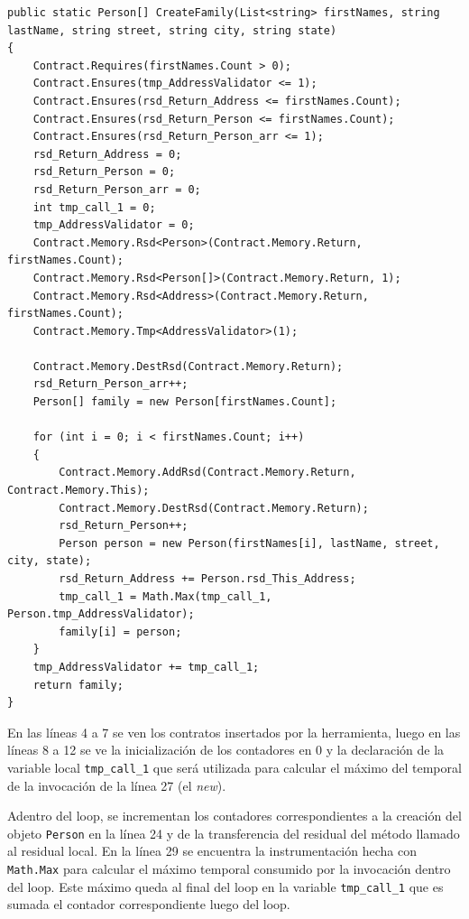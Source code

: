 \documentclass[12pt,a4paper]{article}
\newcommand\mono[1]{\texttt{#1}}
\begin{document}
			\vspace{15pt}
			\begin{scriptsize}
			\begin{lstlisting}[caption=Método \mono{CreateFamily} instrumentado]
public static Person[] CreateFamily(List<string> firstNames, string lastName, string street, string city, string state)
{
    Contract.Requires(firstNames.Count > 0);
    Contract.Ensures(tmp_AddressValidator <= 1);
    Contract.Ensures(rsd_Return_Address <= firstNames.Count);
    Contract.Ensures(rsd_Return_Person <= firstNames.Count);
    Contract.Ensures(rsd_Return_Person_arr <= 1);
    rsd_Return_Address = 0;
    rsd_Return_Person = 0;
    rsd_Return_Person_arr = 0;
    int tmp_call_1 = 0;
    tmp_AddressValidator = 0;
    Contract.Memory.Rsd<Person>(Contract.Memory.Return, firstNames.Count);
    Contract.Memory.Rsd<Person[]>(Contract.Memory.Return, 1);
    Contract.Memory.Rsd<Address>(Contract.Memory.Return, firstNames.Count);
    Contract.Memory.Tmp<AddressValidator>(1);
    
    Contract.Memory.DestRsd(Contract.Memory.Return);
    rsd_Return_Person_arr++;
    Person[] family = new Person[firstNames.Count];
    
    for (int i = 0; i < firstNames.Count; i++)
    {
        Contract.Memory.AddRsd(Contract.Memory.Return, Contract.Memory.This);
        Contract.Memory.DestRsd(Contract.Memory.Return);
        rsd_Return_Person++;
        Person person = new Person(firstNames[i], lastName, street, city, state);
        rsd_Return_Address += Person.rsd_This_Address;
        tmp_call_1 = Math.Max(tmp_call_1, Person.tmp_AddressValidator);
        family[i] = person;
    }
    tmp_AddressValidator += tmp_call_1;
    return family;
}
			\end{lstlisting}
			\end{scriptsize}

			En las líneas 4 a 7 se ven los contratos insertados por la herramienta, luego en las líneas 8 a 12 se ve la inicialización de los contadores en 0 y la declaración de la variable local \mono{tmp\_call\_1} que será utilizada para calcular el máximo del temporal de la invocación de la línea 27 (el \textit{new}).

			Adentro del loop, se incrementan los contadores correspondientes a la creación del objeto \mono{Person} en la línea 24 y de la transferencia del residual del método llamado al residual local. En la línea 29 se encuentra la instrumentación hecha con \mono{Math.Max} para calcular el máximo temporal consumido por la invocación dentro del loop. Este máximo queda al final del loop en la variable \mono{tmp\_call\_1} que es sumada el contador correspondiente luego del loop.
\end{document}
